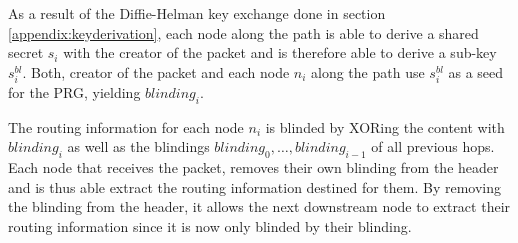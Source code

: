 As a result of the Diffie-Helman key exchange done in section \ref{appendix:keyderivation}, each node along the path is able to derive a shared secret $s_i$ with the creator of the packet and is therefore able to derive a sub-key $s_i^{bl}$. Both, creator of the packet and each node $n_i$ along the path use $s_i^{bl}$ as a seed for the PRG, yielding $blinding_i$.

The routing information for each node $n_i$ is blinded by XORing the content with $blinding_i$ as well as the blindings $blinding_0, \dots , blinding_{i-1}$ of all previous hops. Each node that receives the packet, removes their own blinding from the header and is thus able extract the routing information destined for them. By removing the blinding from the header, it allows the next downstream node to extract their routing information since it is now only blinded by their blinding.

